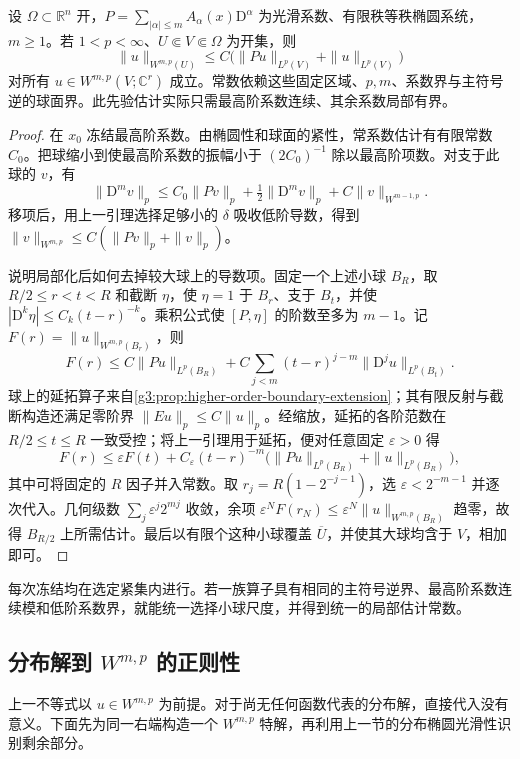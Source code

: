 \begin{theorem}\label{g3:thm:local-elliptic-lp-apriori}
	设 \(\Omega\subset\mathbb R^n\) 开，\(P=\sum_{|\alpha|\le m}A_\alpha(x)\mathrm D^\alpha\) 为光滑系数、有限秩等秩椭圆系统，\(m\ge1\)。若 \(1<p<\infty\)、\(U\Subset V\Subset\Omega\) 为开集，则
	\[
		\|u\|_{W^{m,p}(U)}\le C\bigl(\|Pu\|_{L^p(V)}+\|u\|_{L^p(V)}\bigr)
	\]
	对所有 \(u\in W^{m,p}(V;\mathbb C^r)\) 成立。常数依赖这些固定区域、\(p,m\)、系数界与主符号逆的球面界。此先验估计实际只需最高阶系数连续、其余系数局部有界。
\end{theorem}
\begin{proof}
	在 \(x_0\) 冻结最高阶系数。由椭圆性和球面的紧性，常系数估计有有限常数 \(C_0\)。把球缩小到使最高阶系数的振幅小于 \((2C_0)^{-1}\) 除以最高阶项数。对支于此球的 \(v\)，有
	\[
		\|\mathrm D^mv\|_p\le C_0\|Pv\|_p+\tfrac12\|\mathrm D^mv\|_p+C\|v\|_{W^{m-1,p}}.
	\]
	移项后，用上一引理选择足够小的 \(\delta\) 吸收低阶导数，得到
	\(\|v\|_{W^{m,p}}\le C(\|Pv\|_p+\|v\|_p)\)。

	说明局部化后如何去掉较大球上的导数项。固定一个上述小球 \(B_R\)，取 \(R/2\le r<t<R\) 和截断 \(\eta\)，使 \(\eta=1\) 于 \(B_r\)、支于 \(B_t\)，并使 \(|\mathrm D^k\eta|\le C_k(t-r)^{-k}\)。乘积公式使 \([P,\eta]\) 的阶数至多为 \(m-1\)。记 \(F(r)=\|u\|_{W^{m,p}(B_r)}\)，则
	\[
		F(r)\le C\|Pu\|_{L^p(B_R)}+C\sum_{j<m}(t-r)^{j-m}\|\mathrm D^ju\|_{L^p(B_t)}.
	\]
	球上的延拓算子来自\cref{g3:prop:higher-order-boundary-extension}；其有限反射与截断构造还满足零阶界 \(\|Eu\|_p\le C\|u\|_p\)。经缩放，延拓的各阶范数在 \(R/2\le t\le R\) 一致受控；将上一引理用于延拓，便对任意固定 \(\varepsilon>0\) 得
	\[
		F(r)\le\varepsilon F(t)+C_\varepsilon(t-r)^{-m}
		\bigl(\|Pu\|_{L^p(B_R)}+\|u\|_{L^p(B_R)}\bigr),
	\]
	其中可将固定的 \(R\) 因子并入常数。取 \(r_j=R(1-2^{-j-1})\)，选 \(\varepsilon<2^{-m-1}\) 并逐次代入。几何级数 \(\sum_j\varepsilon^j2^{mj}\) 收敛，余项 \(\varepsilon^NF(r_N)\le\varepsilon^N\|u\|_{W^{m,p}(B_R)}\) 趋零，故得 \(B_{R/2}\) 上所需估计。最后以有限个这种小球覆盖 \(\overline U\)，并使其大球均含于 \(V\)，相加即可。
\end{proof}

每次冻结均在选定紧集内进行。若一族算子具有相同的主符号逆界、最高阶系数连续模和低阶系数界，就能统一选择小球尺度，并得到统一的局部估计常数。

\subsection{\texorpdfstring{分布解到 \(W^{m,p}\) 的正则性}{分布解到 W\textasciicircum{}\{m,p\} 的正则性}}
\label{g3:subsec:1204:05}
上一不等式以 \(u\in W^{m,p}\) 为前提。对于尚无任何函数代表的分布解，直接代入没有意义。下面先为同一右端构造一个 \(W^{m,p}\) 特解，再利用上一节的分布椭圆光滑性识别剩余部分。

